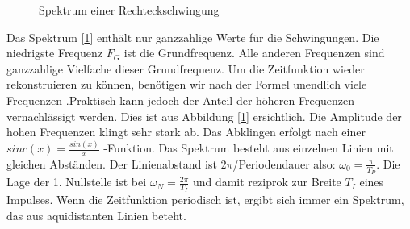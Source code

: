 \documentclass[a4paper,10pt]{article}
\begin{document}
\begin{figure}[!htb]
\centering
{}

\caption{Spektrum einer Rechteckschwingung}%
\label{rechteckschwingung_spektrum}
\end{figure}

Das Spektrum [\ref{rechteckschwingung_spektrum}] enthält nur ganzzahlige Werte für die Schwingungen. Die niedrigste Frequenz $F_G$ ist die Grundfrequenz.
Alle anderen Frequenzen sind ganzzahlige Vielfache dieser Grundfrequenz. Um die Zeitfunktion wieder rekonstruieren 
zu können, benötigen wir nach der Formel unendlich viele Frequenzen .Praktisch kann jedoch der Anteil der höheren 
Frequenzen vernachlässigt werden. Dies ist aus Abbildung [\ref{rechteckschwingung_spektrum}] ersichtlich. Die Amplitude 
der hohen Frequenzen klingt sehr stark ab. Das Abklingen erfolgt nach einer $sinc(x) = \frac{sin(x)}{x}$ -Funktion.
Das Spektrum besteht aus einzelnen Linien mit gleichen Abständen. Der Linienabstand ist $2\pi$/Periodendauer also: $\omega_0  = \frac{\pi}{T_P} $.
Die Lage der 1. Nullstelle ist bei $\omega_N = \frac{2\pi}{T_I}$ und damit reziprok zur Breite $T_I$ eines Impulses.
Wenn die Zeitfunktion periodisch ist, ergibt sich immer ein Spektrum, das aus aquidistanten Linien beteht.
\end{document}
